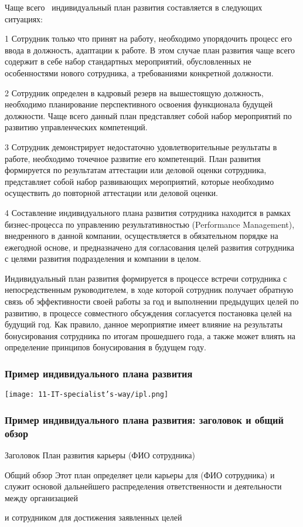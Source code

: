 \documentclass{../industrial-development}
\begin{document}
\lecturenotes

Чаще всего~\cite{IPlan} индивидуальный план развития составляется в следующих ситуациях:

1 Сотрудник только что принят на работу, необходимо упорядочить процесс его ввода в должность, адаптации к работе. В этом случае план развития чаще всего содержит в себе набор стандартных мероприятий, обусловленных не особенностями нового сотрудника, а требованиями конкретной должности.

2 Сотрудник определен в кадровый резерв на вышестоящую должность, необходимо планирование перспективного освоения функционала будущей должности. Чаще всего данный план представляет собой набор мероприятий по развитию управленческих компетенций.

3 Сотрудник демонстрирует недостаточно удовлетворительные результаты в работе, необходимо точечное развитие его компетенций. План развития формируется по результатам аттестации или деловой оценки сотрудника, представляет собой набор развивающих мероприятий, которые необходимо осуществить до повторной аттестации или деловой оценки.

4 Составление индивидуального плана развития сотрудника находится в рамках бизнес-процесса по управлению результативностью (Performance Management), внедренного в данной компании, осуществляется в обязательном порядке на ежегодной основе, и предназначено для согласования целей развития сотрудника с целями развития подразделения и компании в целом. 

Индивидуальный план развития формируется в процессе встречи сотрудника с непосредственным руководителем, в ходе которой сотрудник получает обратную связь об эффективности своей работы за год и выполнении предыдущих целей по развитию, в процессе совместного обсуждения согласуется постановка целей на будущий год. Как правило, данное мероприятие имеет влияние на результаты бонусирования сотрудника по итогам прошедшего года, а также может влиять на определение принципов бонусирования в будущем году.



\begin{frame} \frametitle{Пример индивидуального плана развития }
 \centerline{\texttt{[image: 11-IT-specialist's-way/ipl.png]}}
\end{frame}

\begin{frame} \frametitle{Пример индивидуального плана развития: заголовок и общий обзор }
 \begin{block}{ Заголовок}
План развития карьеры (ФИО сотрудника)
\end{block}
 \begin{block}{ Общий обзор}
Этот план определяет цели карьеры для (ФИО сотрудника) и служит основой дальнейшего распределения ответственности и деятельности между организацией 

и сотрудником для достижения заявленных целей
\end{block}
\end{frame}
\end{document}
